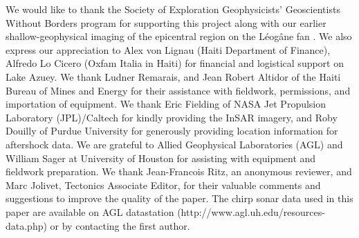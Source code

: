 \documentclass[linenumbers,draft]{agujournal}
\begin{document}
\acknowledgments
We would like to thank the Society of Exploration Geophysicists' Geoscientists Without Borders program for supporting this project along with our earlier shallow-geophysical imaging of the epicentral region on the L\'eog\^ane fan \citep{kocel2016near}. We also express our appreciation to Alex von Lignau (Haiti Department of Finance), Alfredo Lo Cicero (Oxfam Italia in Haiti) for financial and logistical support on Lake Azuey. We thank Ludner Remarais, and Jean Robert Altidor of the Haiti Bureau of Mines and Energy for their assistance with fieldwork, permissions, and importation of equipment. We thank Eric Fielding of NASA Jet Propulsion Laboratory (JPL)/Caltech for kindly providing the InSAR imagery, and Roby Douilly of Purdue University for generously providing location information for aftershock data. We are grateful to Allied Geophysical Laboratories (AGL) and William Sager at University of Houston for assisting with equipment and fieldwork preparation. We thank Jean-Francois Ritz, an anonymous reviewer, and Marc Jolivet, Tectonics Associate Editor, for their valuable comments and suggestions to improve the quality of the paper. The chirp sonar data used in this paper are available on AGL datastation (http://www.agl.uh.edu/resources-data.php) or by contacting the first author. 

\clearpage
%
\end{document}
